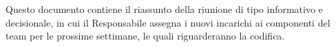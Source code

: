 Questo documento contiene il riassunto della riunione di tipo informativo e decisionale, in cui il Responsabile assegna i nuovi incarichi ai componenti del team per le prossime settimane, le quali riguarderanno la codifica.
